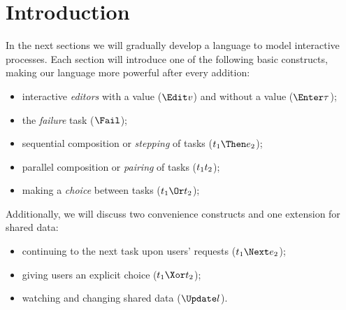 
\section{Introduction}

In the next sections we will gradually develop a language to model interactive processes.
Each section will introduce one of the following basic constructs,
making our language more powerful after every addition:
\begin{itemize}
  \item interactive \emph{editors} with a value ($\Edit v$) and without a value ($\Enter \tau$);
  \item the \emph{failure} task ($\Fail$);
  \item sequential composition or \emph{stepping} of tasks ($t_1 \Then e_2$);
  \item parallel composition or \emph{pairing} of tasks ($t_1 \relax t_2$);
  \item making a \emph{choice} between tasks ($t_1 \Or t_2$);
\end{itemize}
Additionally, we will discuss two convenience constructs and one extension for shared data:
\begin{itemize}
  \item continuing to the next task upon users' requests ($t_1 \Next e_2$);
  \item giving users an explicit choice ($t_1 \Xor t_2$);
  \item watching and changing shared data ($\Update l$).
\end{itemize}

